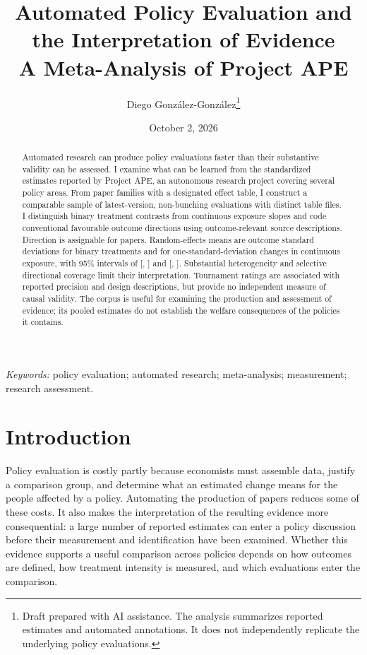\documentclass[11pt]{article}
\title{Automated Policy Evaluation and the Interpretation of Evidence\\[6pt]
\large A Meta-Analysis of Project APE}
\author{Diego Gonz\'alez-Gonz\'alez\thanks{Draft prepared with AI assistance. The analysis summarizes reported estimates and automated annotations. It does not independently replicate the underlying policy evaluations.}}
\date{October 2, 2026}
\begin{document}
\maketitle
\begin{abstract}
Automated research can produce policy evaluations faster than their substantive validity can be assessed. I examine what can be learned from the standardized estimates reported by Project APE, an autonomous research project covering several policy areas. From \FamiliesN{} paper families with a designated effect table, I construct a comparable sample of \StandardizedN{} latest-version, non-bunching evaluations with distinct table files. I distinguish binary treatment contrasts from continuous exposure slopes and code conventional favourable outcome directions using outcome-relevant source descriptions. Direction is assignable for \OrientedN{} papers. Random-effects means are \BinaryMean{} outcome standard deviations for binary treatments and \ContinuousMean{} for one-standard-deviation changes in continuous exposure, with 95\% intervals of [\BinaryLo{}, \BinaryHi{}] and [\ContinuousLo{}, \ContinuousHi{}]. Substantial heterogeneity and selective directional coverage limit their interpretation. Tournament ratings are associated with reported precision and design descriptions, but provide no independent measure of causal validity. The corpus is useful for examining the production and assessment of evidence; its pooled estimates do not establish the welfare consequences of the policies it contains.
\end{abstract}
\noindent\textit{Keywords:} policy evaluation; automated research; meta-analysis; measurement; research assessment.

\section{Introduction}\label{sec:intro}
Policy evaluation is costly partly because economists must assemble data, justify a comparison group, and determine what an estimated change means for the people affected by a policy. Automating the production of papers reduces some of these costs. It also makes the interpretation of the resulting evidence more consequential: a large number of reported estimates can enter a policy discussion before their measurement and identification have been examined. Whether this evidence supports a useful comparison across policies depends on how outcomes are defined, how treatment intensity is measured, and which evaluations enter the comparison.
\end{document}
